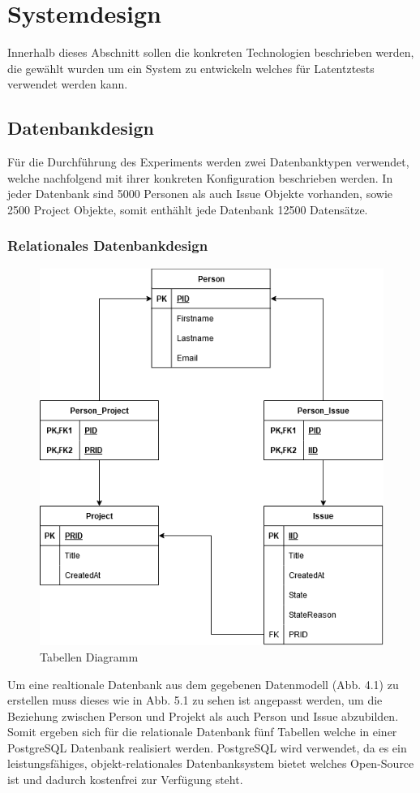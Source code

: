 \chapter{Systemdesign} %
\label{sec:systemdesign}
Innerhalb dieses Abschnitt sollen die konkreten Technologien beschrieben werden, die gewählt wurden um ein System zu entwickeln welches für Latentztests verwendet werden kann.
\section{Datenbankdesign} %
Für die Durchführung des Experiments werden zwei Datenbanktypen verwendet, welche nachfolgend mit ihrer konkreten Konfiguration beschrieben werden. In jeder Datenbank sind 5000 Personen als auch Issue Objekte vorhanden, sowie 2500 Project Objekte, somit enthählt jede Datenbank 12500 Datensätze.
\label{sec:datenbankdesign}
\subsection{Relationales Datenbankdesign} %
\label{sec:relationalesdatenbankdesign}

\begin{figure}[H]
	\centering
	\includegraphics[scale=0.6]{Illustrations/table_diagram.png}
	\caption{Tabellen Diagramm}
\end{figure}
Um eine realtionale Datenbank aus dem gegebenen Datenmodell (Abb. 4.1) zu erstellen muss dieses wie in Abb. 5.1 zu sehen ist angepasst werden, um die Beziehung zwischen Person und Projekt als auch Person und Issue abzubilden. Somit ergeben sich für die relationale Datenbank fünf Tabellen welche in einer PostgreSQL Datenbank realisiert werden. PostgreSQL wird verwendet, da es ein leistungsfähiges, objekt-relationales Datenbanksystem bietet welches Open-Source ist und dadurch kostenfrei zur Verfügung steht. 
